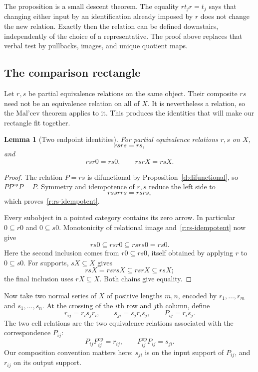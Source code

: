 \documentclass[11pt]{article}
\newtheorem{lemma}[theorem]{Lemma}
\theoremstyle{definition}
\theoremstyle{remark}\newtheorem{remark}[theorem]{Remark}
\begin{document}
The proposition is a small descent theorem.  The equality $rt_jr=t_j$
says that changing either input by an identification already imposed by
$r$ does not change the new relation.  Exactly then the relation can be
defined downstairs, independently of the choice of a representative.
The proof above replaces that verbal test by pullbacks, images, and
unique quotient maps.

\subsection{The comparison rectangle}

Let $r,s$ be partial equivalence relations on the same object.  Their
composite $rs$ need not be an equivalence relation on all of $X$.  It is
nevertheless a relation, so the Mal'cev theorem applies to it.  This
produces the identities that will make our rectangle fit together.

\begin{lemma}[Two endpoint identities]
\label{r:endpoint-identities}
For partial equivalence relations $r,s$ on $X$,
\begin{equation}
\label{r:rs-idempotent}
                  rsrs=rs,
\end{equation}
and
\begin{equation}
\label{r:endpoint-equalities}
                  rsr0=rs0,\qquad rsrX=rsX.
\end{equation}
\end{lemma}

\begin{proof}
The relation $P=rs$ is difunctional by Proposition~\ref{d:difunctional}, so
$PP^{\mathrm{op}}P=P$.  Symmetry and idempotence of $r,s$ reduce the left
side to
\[
           rssrrs=rsrs,
\]
which proves~\eqref{r:rs-idempotent}.

Every subobject in a pointed category contains its zero arrow.  In
particular $0\subseteq r0$ and $0\subseteq s0$.  Monotonicity of relational
image and~\eqref{r:rs-idempotent} now give
\[
 rs0\subseteq rsr0\subseteq rsrs0=rs0.
\]
Here the second inclusion comes from $r0\subseteq rs0$, itself obtained
by applying $r$ to $0\subseteq s0$.  For supports, $sX\subseteq X$ gives
\[
        rsX=rsrsX\subseteq rsrX\subseteq rsX;
\]
the final inclusion uses $rX\subseteq X$.  Both chains give equality.
\end{proof}

Now take two normal series of $X$ of positive lengths $m,n$, encoded by
$r_1,\ldots,r_m$ and $s_1,\ldots,s_n$.  At the crossing of the $i$th row
and $j$th column, define
\begin{equation}
\label{r:cells}
       r_{ij}=r_is_jr_i,\qquad
       s_{ji}=s_jr_is_j,\qquad P_{ij}=r_is_j.
\end{equation}
The two cell relations are the two equivalence relations associated with
the correspondence $P_{ij}$:
\[
       P_{ij}P_{ij}^{\mathrm{op}}=r_{ij},\qquad
       P_{ij}^{\mathrm{op}}P_{ij}=s_{ji}.
\]
Our composition convention matters here: $s_{ji}$ is on the input support
of $P_{ij}$, and $r_{ij}$ on its output support.
\end{document}

